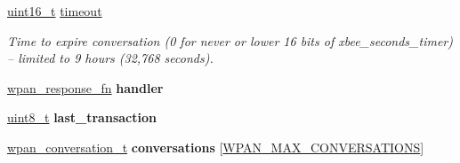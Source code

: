 \begin{DoxyCompactItemize}
\item 
\hyperlink{group__hal_ga5a8b2dc9e45a9ee81a94ef304fb62505}{uint16\-\_\-t} \hyperlink{group__wpan__aps_ga7f1ad43d3bf79b40bc39dbb5a6c3a5ae}{timeout}
\begin{DoxyCompactList}\small\item\em Time to expire conversation (0 for never or lower 16 bits of xbee\-\_\-seconds\-\_\-timer) -- limited to 9 hours (32,768 seconds). \end{DoxyCompactList}\item 
\hypertarget{group__wpan__aps_gabc22a182e7dcbd60a04e8a4eb648aaa2}{\hyperlink{group__wpan__aps_gaffe7bb679e9ba6de49f68fdc584fbefb}{wpan\-\_\-response\-\_\-fn} {\bfseries handler}}\label{group__wpan__aps_gabc22a182e7dcbd60a04e8a4eb648aaa2}

\item 
\hypertarget{group__wpan__aps_ga9e18c6583d7c94f03b10fc1e99187939}{\hyperlink{group__hal_gae1affc9ca37cfb624959c866a73f83c2}{uint8\-\_\-t} {\bfseries last\-\_\-transaction}}\label{group__wpan__aps_ga9e18c6583d7c94f03b10fc1e99187939}

\item 
\hypertarget{group__wpan__aps_gaf9565ebe099d08e3f9f26783a4f89826}{\hyperlink{structwpan__conversation__t}{wpan\-\_\-conversation\-\_\-t} {\bfseries conversations} \mbox{[}\hyperlink{group__wpan__aps_gae34b1efc8ba99add17fcd767852197d4}{W\-P\-A\-N\-\_\-\-M\-A\-X\-\_\-\-C\-O\-N\-V\-E\-R\-S\-A\-T\-I\-O\-N\-S}\mbox{]}}\label{group__wpan__aps_gaf9565ebe099d08e3f9f26783a4f89826}

\end{DoxyCompactItemize}
